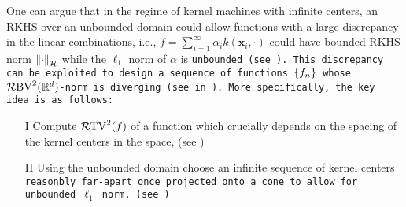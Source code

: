 One can argue that in the regime of kernel machines with infinite centers, an RKHS over an unbounded domain could allow functions with a large discrepancy in the linear combinations, i.e., $f = \sum_{i=1}^\infty \alpha_i k(\bm{x}_i,\cdot)$ could have bounded RKHS norm  $\left\|\cdot\right\|_{{\mathcal{H}}}$ while the $\ell_1$ norm of $\alpha$ is \tt{unbounded} (see ). This discrepancy can be exploited to design a sequence of functions $\left\{f_n\right\}$ whose $\mathcal{R}\mathrm{BV}^2({\mathbb{R}^d})$-norm is diverging (see  in ).
More specifically, the key idea is as follows:
\begin{itemize}
    \item[I] Compute $\mathcal{R}\mathrm{TV}^2({f})$ of a function which crucially depends on the spacing of the kernel centers in the space, (see )\vspace{-.5mm}
    \item[II] Using the unbounded domain choose an infinite sequence of kernel centers \tt{reasonbly} far-apart once projected onto a cone to allow for unbounded $\ell_1$ norm. (see )\vspace{-.5mm}
\end{itemize}
 



